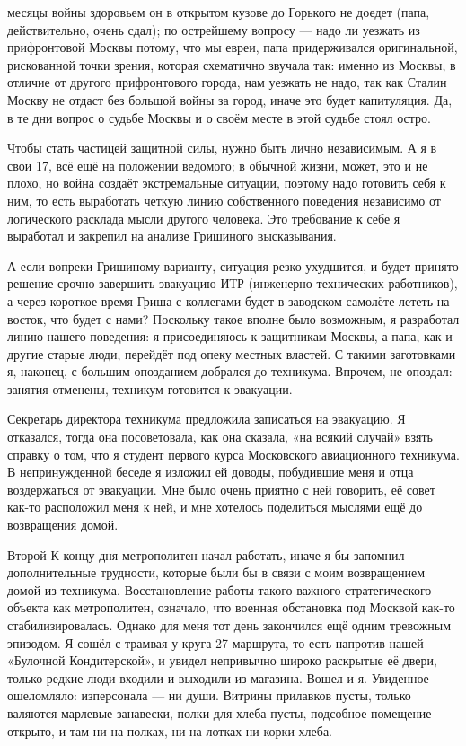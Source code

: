 \label{216-1}
месяцы войны здоровьем он в открытом кузове до Горького не доедет (папа, действительно, очень сдал); по острейшему вопросу — надо ли уезжать из прифронтовой Москвы потому, что мы евреи, папа придерживался оригинальной, рискованной точки зрения, которая схематично звучала так: именно из Москвы, в отличие от другого прифронтового города, нам уезжать не надо, так как Сталин Москву не отдаст без большой войны за город, иначе это будет капитуляция. Да, в те дни вопрос о судьбе Москвы и о своём месте в этой судьбе стоял остро.

\label{217-1}
Чтобы стать частицей защитной силы, нужно быть лично независимым. А я в свои 17, всё ещё на положении ведомого; в обычной жизни, может, это и не плохо, но война создаёт экстремальные ситуации, поэтому надо готовить себя к ним, то есть выработать четкую линию собственного поведения независимо от логического расклада мысли другого человека. Это требование к себе я выработал и закрепил на анализе Гришиного высказывания.

\label{218-1}
А если вопреки Гришиному варианту, ситуация резко ухудшится, и будет принято решение срочно завершить эвакуацию ИТР (инженерно-технических работников), а через короткое время Гриша с коллегами будет в заводском самолёте лететь на восток, что будет с нами? Поскольку такое вполне было возможным, я разработал линию нашего поведения: я присоединяюсь к защитникам Москвы, а папа, как и другие старые люди, перейдёт под опеку местных властей. С такими заготовками я, наконец, с большим опозданием добрался до техникума. Впрочем, не опоздал: занятия отменены, техникум готовится к эвакуации.

\label{219-1}
Секретарь директора техникума предложила записаться на эвакуацию. Я отказался, тогда она посоветовала, как она сказала, «на всякий случай» взять справку о том, что я студент первого курса Московского авиационного техникума. В непринужденной беседе я изложил ей доводы, побудившие меня и отца воздержаться от эвакуации. Мне было очень приятно с ней говорить, её совет как-то расположил меня к ней, и мне хотелось поделиться мыслями ещё до возвращения домой.

\label{221-1}
Второй
К концу дня метрополитен начал работать, иначе я бы запомнил дополнительные трудности, которые были бы в связи с моим возвращением домой из техникума. Восстановление работы такого важного стратегического объекта как метрополитен, означало, что военная обстановка под Москвой как-то стабилизировалась. Однако для меня тот день закончился ещё одним тревожным эпизодом. Я сошёл с трамвая у круга 27 маршрута, то есть напротив нашей «Булочной Кондитерской», и увидел непривычно широко раскрытые её двери, только редкие люди входили и выходили из магазина. Вошел и я. Увиденное ошеломляло: изперсонала — ни души. Витрины прилавков пусты, только валяются марлевые занавески, полки для хлеба пусты, подсобное помещение открыто, и там ни на полках, ни на лотках ни корки хлеба.

